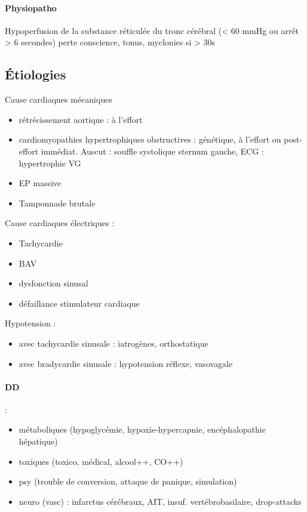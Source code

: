 \documentclass{article}
\begin{document}
\paragraph{Physiopatho}
Hypoperfusion de la substance réticulée du tronc cérébral (< 60 mmHg ou arrêt >
6 secondes) \thus perte conscience, tonus, myclonies si > 30s

\subsection{Étiologies}
Cause cardiaques mécaniques
\begin{itemize}
  \item rétrécissement aortique : à l'effort
  \item cardiomyopathies hypertrophiques obstructives : génétique, à l'effort ou
    post-effort immédiat. Auscut : souffle systolique sternum gauche, ECG :
    hypertrophie VG
  \item EP massive
  \item Tamponnade brutale
\end{itemize}

Cause cardiaques électriques :
\begin{itemize}
  \item Tachycardie
  \item BAV
  \item dysfonction sinusal
  \item défaillance stimulateur cardiaque
\end{itemize}

Hypotension :
\begin{itemize}
  \item avec tachycardie sinusale : iatrogènes, orthostatique
  \item avec bradycardie sinusale : hypotension réflexe, vasovagale
\end{itemize}

\paragraph{DD} : 
\begin{itemize}
  \item métaboliques (hypoglycémie, hypoxie-hypercapnie,
encéphalopathie hépatique)
\item toxiques (toxico, médical, alcool++, CO++)
\item psy (trouble de conversion, attaque de panique, simulation)
\item neuro (vasc) : infarctus cérébraux, AIT, insuf. vertébrobasilaire,
  drop-attacks
\end{itemize}
\end{document}
